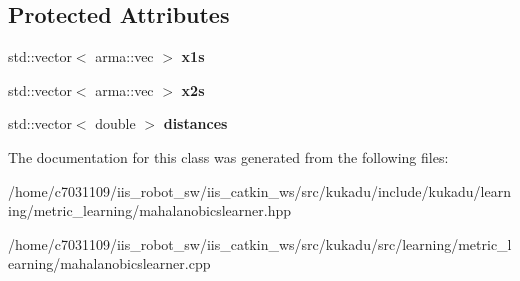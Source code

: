 \subsection*{Protected Attributes}
\begin{DoxyCompactItemize}
\item 
\hypertarget{classkukadu_1_1MahalanobisLearner_a3ea033162dbf7ac4abec5411551893ca}{std\-::vector$<$ arma\-::vec $>$ {\bfseries x1s}}\label{classkukadu_1_1MahalanobisLearner_a3ea033162dbf7ac4abec5411551893ca}

\item 
\hypertarget{classkukadu_1_1MahalanobisLearner_ae0e587ea27bf3d609707a4eb6f919277}{std\-::vector$<$ arma\-::vec $>$ {\bfseries x2s}}\label{classkukadu_1_1MahalanobisLearner_ae0e587ea27bf3d609707a4eb6f919277}

\item 
\hypertarget{classkukadu_1_1MahalanobisLearner_af587d7f1d1679175071497d4c37ceef9}{std\-::vector$<$ double $>$ {\bfseries distances}}\label{classkukadu_1_1MahalanobisLearner_af587d7f1d1679175071497d4c37ceef9}

\end{DoxyCompactItemize}


The documentation for this class was generated from the following files\-:\begin{DoxyCompactItemize}
\item 
/home/c7031109/iis\-\_\-robot\-\_\-sw/iis\-\_\-catkin\-\_\-ws/src/kukadu/include/kukadu/learning/metric\-\_\-learning/mahalanobicslearner.\-hpp\item 
/home/c7031109/iis\-\_\-robot\-\_\-sw/iis\-\_\-catkin\-\_\-ws/src/kukadu/src/learning/metric\-\_\-learning/mahalanobicslearner.\-cpp\end{DoxyCompactItemize}
